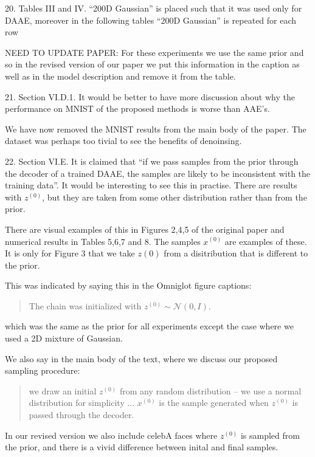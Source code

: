 \documentclass{article}
\begin{document}
{\color{blue}
20. Tables III and IV. ``200D Gaussian'' is placed such that it was used only for DAAE, moreover in the following tables ``200D Gaussian'' is repeated for each row\\
}

{\color{red} NEED TO UPDATE PAPER: For these experiments we use the same prior and so in the revised version of our paper we put this information in the caption as well as in the model description and remove it from the table.\\}

{\color{blue}
21. Section VI.D.1. It would be better to have more discussion about why the performance on MNIST of the proposed methods is worse than AAE's.\\
}

{\color{red} We have now removed the MNIST results from the main body of the paper. The dataset was perhaps too tivial to see the benefits of denoinsing.\\}

{\color{blue}
22. Section VI.E. It is claimed that ``if we pass samples from the prior through the decoder of a trained DAAE, the samples are likely to be inconsistent with the training data''. It would be interesting to see this in practise. There are results with $z^{(0)}$, but they are taken from some other distribution rather than from the prior.\\
}

{\color{red}
There are visual examples of this in Figures 2,4,5 of the original paper and numerical results in Tables 5,6,7 and 8. The samples $x^{(0)}$ are examples of these. It is only for Figure 3 that we take $z{(0)}$ from a disitribution that is different to the prior.

This was indicated by saying this in the Omniglot figure captions:

\begin{quote}
The chain was initialized with $z^{(0)} \sim \mathcal{N}(0,I)$.
\end{quote}
which was the same as the prior for all experiments except the case where we used a 2D mixture of Gaussian.

We also say in the main body of the text, where we discuss our proposed sampling procedure:
\begin{quote}
we draw an initial $z^{(0)}$ from any random distribution – we use a normal distribution for simplicity ... $x^{(0)}$ is the sample generated when $z^{(0)}$ is passed through the decoder.
\end{quote}

In our revised version we also include celebA faces where $z^{(0)}$ is sampled from the prior, and there is a vivid difference between inital and final samples.\\
}
\end{document}
